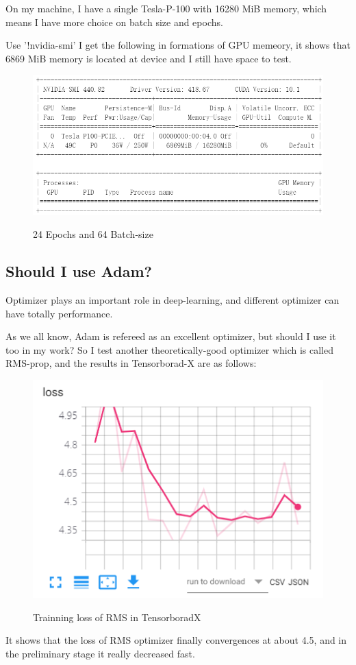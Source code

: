 \documentclass{article}
\begin{document}
On my machine, I have a  single Tesla-P-100 with 16280 MiB memory, which means I have more choice on batch size and epochs. 

Use '!nvidia-smi' I get the following in formations of GPU memeory, it shows that 6869 MiB memory is located at device and I still have space to test. 
\begin{figure}[H]%
  \centering
  \caption{24 Epochs and 64 Batch-size}
  \includegraphics[width=\columnwidth]{IMG/ML实验GPU.png} %
  \label{Fig.RNN} %
\end{figure}
\subsection{Should I use Adam?}
Optimizer plays an important role in deep-learning, and different optimizer can have totally performance.

As we all know, Adam is refereed as an excellent optimizer, but should I use it too in my work? So I test another theoretically-good optimizer which is called RMS-prop, and the results in Tensorborad-X are as follows:
\begin{figure}[H]%
  \centering
  \caption{Trainning loss of RMS in TensorboradX}
  \includegraphics[width=40ex]{IMG/loss_RMSprop.png} %
  \label{Fig.RNN} %
\end{figure}
It shows that the loss of RMS optimizer finally  convergences at about 4.5, and in the preliminary stage it really decreased fast.
\end{document}
